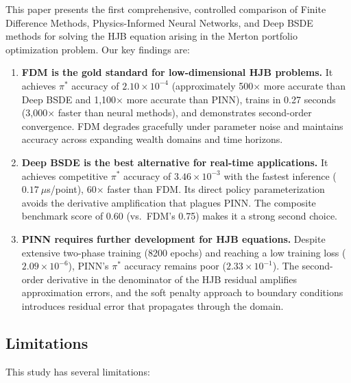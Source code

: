 \documentclass[12pt,a4paper]{article}
\begin{document}
This paper presents the first comprehensive, controlled comparison of Finite Difference Methods, Physics-Informed Neural Networks, and Deep BSDE methods for solving the HJB equation arising in the Merton portfolio optimization problem. Our key findings are:

\begin{enumerate}
    \item \textbf{FDM is the gold standard for low-dimensional HJB problems.} It achieves $\pi^*$ accuracy of $2.10 \times 10^{-4}$ (approximately 500$\times$ more accurate than Deep BSDE and 1,100$\times$ more accurate than PINN), trains in 0.27 seconds (3,000$\times$ faster than neural methods), and demonstrates second-order convergence. FDM degrades gracefully under parameter noise and maintains accuracy across expanding wealth domains and time horizons.
    
    \item \textbf{Deep BSDE is the best alternative for real-time applications.} It achieves competitive $\pi^*$ accuracy of $3.46 \times 10^{-3}$ with the fastest inference ($0.17\ \mu$s/point), 60$\times$ faster than FDM. Its direct policy parameterization avoids the derivative amplification that plagues PINN. The composite benchmark score of 0.60 (vs.\ FDM's 0.75) makes it a strong second choice.
    
    \item \textbf{PINN requires further development for HJB equations.} Despite extensive two-phase training (8200 epochs) and reaching a low training loss ($2.09 \times 10^{-6}$), PINN's $\pi^*$ accuracy remains poor ($2.33 \times 10^{-1}$). The second-order derivative in the denominator of the HJB residual amplifies approximation errors, and the soft penalty approach to boundary conditions introduces residual error that propagates through the domain.
\end{enumerate}

\subsection{Limitations}

This study has several limitations:
\end{document}

